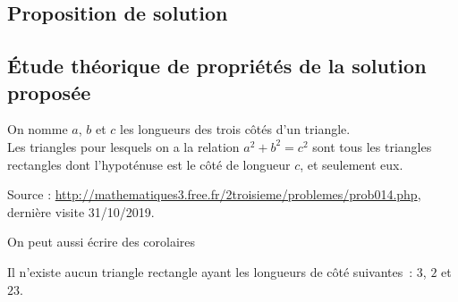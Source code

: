 \documentclass[francais,RandD]{rapportPFE}
\begin{document}
		\subsection{Proposition de solution}


		\subsection{Étude théorique de propriétés de la solution proposée}
			\begin{Theorem}
				\label{Th:Pythagore}
				On nomme $a$, $b$ et $c$ les longueurs des trois côtés d'un triangle.\\
				Les triangles pour lesquels on a la relation $a^{2}+ b^{2} = c^{2}$ sont tous les triangles rectangles dont l'hypoténuse est le côté de longueur $c$, et seulement eux.

				Source : \url{http://mathematiques3.free.fr/2troisieme/problemes/prob014.php}, dernière visite 31/10/2019.
			\end{Theorem}

			On peut aussi écrire des corolaires
			\begin{Corollary}[]
				\label{Cor:TriangleImpossible}
				Il n'existe aucun triangle rectangle ayant les longueurs de côté suivantes~: $3$, $2$ et $23$.
			\end{Corollary}
\end{document}
